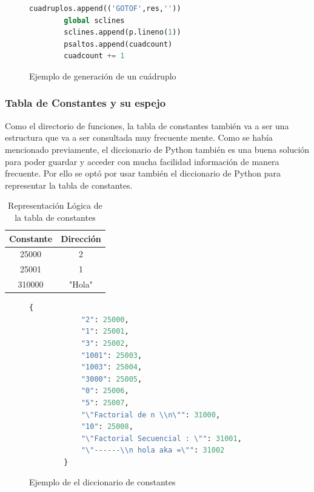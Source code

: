 \begin{figure}[htbp]
    \centering
    \begin{lstlisting}[language=Python]
        cuadruplos.append(('GOTOF',res,''))
        global sclines
        sclines.append(p.lineno(1))
        psaltos.append(cuadcount)
        cuadcount += 1
    \end{lstlisting}
    \caption{Ejemplo de generación de un cuádruplo}
    \label{fig:my_label}
\end{figure}
\FloatBarrier

\subsubsection{Tabla de Constantes y su espejo}

Como el directorio de funciones, la tabla de constantes también va a ser una estructura que va a ser consultada muy frecuente mente. Como se había mencionado previamente, el diccionario de Python también es una buena solución para poder guardar y acceder con mucha facilidad información de manera frecuente. Por ello se optó por usar también el diccionario de Python para representar la tabla de constantes.


\begin{table}[htbp]
    \centering
    \begin{tabular}{c|c}
         Constante & Dirección \\ \hline
         25000 & 2 \\
         25001 & 1 \\
         310000 & "Hola" \\
    \end{tabular}
    \caption{Representación Lógica de la tabla de constantes}
    \label{tab:my_label}
\end{table}
\FloatBarrier

\begin{figure}[htbp]
    \centering
    \begin{lstlisting}[language=Python]
        {                                         
            "2": 25000,                            
            "1": 25001,                            
            "3": 25002,                            
            "1001": 25003,                         
            "1003": 25004,                         
            "3000": 25005,                         
            "0": 25006,                            
            "5": 25007,                            
            "\"Factorial de n \\n\"": 31000,       
            "10": 25008,                           
            "\"Factorial Secuencial : \"": 31001,  
            "\"------\\n hola aka =\"": 31002      
        }                                           
    \end{lstlisting}
    \caption{Ejemplo de el diccionario de constantes}
    \label{fig:my_label}
\end{figure}
\FloatBarrier

